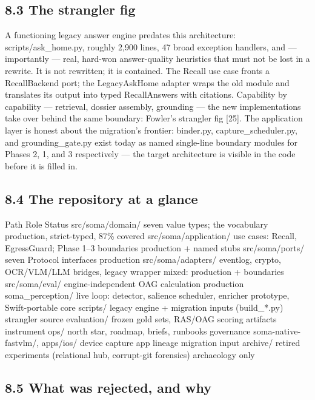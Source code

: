 \subsection{8.3 The strangler fig}\label{the-strangler-fig}

A functioning legacy answer engine predates this architecture: scripts/ask\_home.py, roughly 2,900 lines, 47 broad exception handlers, and --- importantly --- real, hard-won answer-quality heuristics that must not be lost in a rewrite. It is not rewritten; it is contained. The Recall use case fronts a RecallBackend port; the LegacyAskHome adapter wraps the old module and translates its output into typed RecallAnswers with citations. Capability by capability --- retrieval, dossier assembly, grounding --- the new implementations take over behind the same boundary: Fowler's strangler fig {[}25{]}. The application layer is honest about the migration's frontier: binder.py, capture\_scheduler.py, and grounding\_gate.py exist today as named single-line boundary modules for Phases 2, 1, and 3 respectively --- the target architecture is visible in the code before it is filled in.

\subsection{8.4 The repository at a glance}\label{the-repository-at-a-glance}

Path Role Status src/soma/domain/ seven value types; the vocabulary production, strict-typed, 87\% covered src/soma/application/ use cases: Recall, EgressGuard; Phase 1--3 boundaries production + named stubs src/soma/ports/ seven Protocol interfaces production src/soma/adapters/ eventlog, crypto, OCR/VLM/LLM bridges, legacy wrapper mixed: production + boundaries src/soma/eval/ engine-independent OAG calculation production soma\_perception/ live loop: detector, salience scheduler, enricher prototype, Swift-portable core scripts/ legacy engine + migration inputs (build\_*.py) strangler source evaluation/ frozen gold sets, RAS/OAG scoring artifacts instrument ops/ north star, roadmap, briefs, runbooks governance soma-native-fastvlm/, apps/ios/ device capture app lineage migration input archive/ retired experiments (relational hub, corrupt-git forensics) archaeology only

\subsection{8.5 What was rejected, and why}\label{what-was-rejected-and-why}

